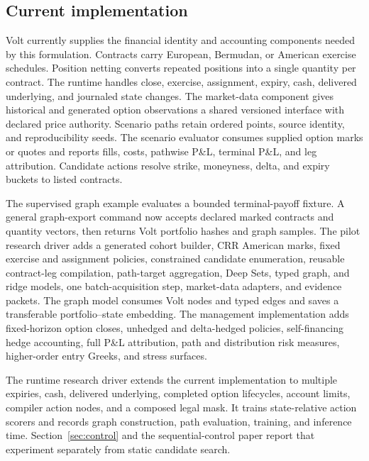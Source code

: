\documentclass{strategynet-journal}
\newcommand{\VOLT}{\textsf{Volt}}
\begin{document}
\begin{SNcolumns}

\section{Current implementation}
\label{sec:implementation}

\VOLT{} currently supplies the financial identity and accounting components
needed by this formulation.  Contracts carry European, Bermudan, or American
exercise schedules.  Position netting converts repeated positions into a
single quantity per contract.  The runtime handles close, exercise,
assignment, expiry, cash, delivered underlying, and journaled state changes.
The market-data component gives historical and generated option observations a
shared versioned interface with declared price authority.  Scenario paths
retain ordered points, source identity, and reproducibility seeds.
The scenario evaluator consumes supplied option marks or quotes and reports
fills, costs, pathwise P\&L, terminal P\&L, and leg attribution.  Candidate
actions resolve strike, moneyness, delta, and expiry buckets to listed
contracts.

The supervised graph example evaluates a bounded terminal-payoff fixture.  A
general graph-export command now accepts declared marked contracts and
quantity vectors, then returns \VOLT{} portfolio hashes and graph samples.  The
pilot research driver adds a generated cohort builder, CRR American marks,
fixed exercise and assignment policies, constrained candidate enumeration,
reusable contract-leg compilation, path-target aggregation, Deep Sets, typed graph, and ridge models, one
batch-acquisition step, market-data adapters, and evidence packets.  The graph
model consumes Volt nodes and typed edges and saves a transferable
portfolio--state embedding.  The management implementation adds
fixed-horizon option closes, unhedged and delta-hedged policies, self-financing
hedge accounting, full P\&L attribution, path and distribution risk measures,
higher-order entry Greeks, and stress surfaces.

The runtime research driver extends the current implementation to multiple expiries, cash,
delivered underlying, completed option lifecycles, account limits, compiler
action nodes, and a composed legal mask.  It trains state-relative action
scorers and records graph construction, path evaluation, training, and
inference time.  Section~\ref{sec:control} and the sequential-control paper
report that experiment separately from static candidate search.


\end{SNcolumns}
\end{document}
